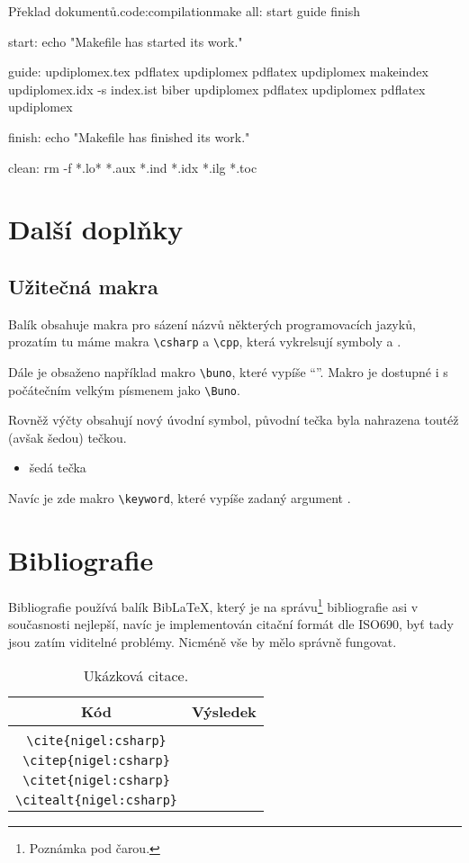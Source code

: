 \documentclass[a4paper,12pt]{article}
\begin{document}
\begin{upcode}{Překlad dokumentů.}{code:compilation}{make}
all: start guide finish

start:
	echo "Makefile has started its work."

guide:	updiplomex.tex
	pdflatex updiplomex
	pdflatex updiplomex
	makeindex updiplomex.idx -s index.ist
	biber updiplomex
	pdflatex updiplomex
	pdflatex updiplomex

finish:
	echo "Makefile has finished its work."

clean:
	rm -f *.lo* *.aux *.ind *.idx *.ilg *.toc
\end{upcode}

\section{Další doplňky}
\subsection{Užitečná makra}
Balík obsahuje makra pro sázení názvů některých programovacích jazyků, prozatím tu máme makra \verb|\csharp| a \verb|\cpp|, která vykrelsují symboly \csharp a \cpp.

Dále je obsaženo například makro \verb|\buno|, které vypíše \enquote{\buno}. Makro je dostupné i s počátečním velkým písmenem jako \verb|\Buno|.

Rovněž výčty obsahují nový úvodní symbol, původní tečka byla nahrazena toutéž (avšak šedou) tečkou.
\begin{itemize}
\item šedá tečka
\end{itemize}

Navíc je zde makro \verb|\keyword|, které vypíše zadaný argument .

\section{Bibliografie}
Bibliografie používá balík Bib\LaTeX, který je na správu\footnote{Poznámka pod čarou.} bibliografie asi v současnosti nejlepší, navíc je implementován citační formát dle ISO690, byť tady jsou zatím viditelné problémy. Nicméně vše by mělo správně fungovat.

\begin{table}
\caption{Ukázková citace.}
\begin{center}
\begin{tabular}{c|l}
Kód & Výsledek \\
\hline \\
\verb|\cite{nigel:csharp}| & \cite{nigel:csharp} \\
\verb|\citep{nigel:csharp}| & \citep{nigel:csharp} \\
\verb|\citet{nigel:csharp}| & \citet{nigel:csharp} \\
\verb|\citealt{nigel:csharp}| & \citealt{nigel:csharp}
\end{tabular}
\end{center}
\end{table}
\end{document}
